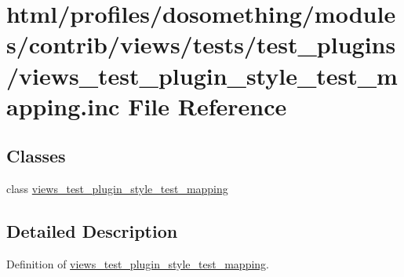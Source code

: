 \hypertarget{views__test__plugin__style__test__mapping_8inc}{
\section{html/profiles/dosomething/modules/contrib/views/tests/test\_\-plugins/views\_\-test\_\-plugin\_\-style\_\-test\_\-mapping.inc File Reference}
\label{views__test__plugin__style__test__mapping_8inc}
}
\subsection*{Classes}
\begin{DoxyCompactItemize}
\item 
class \hyperlink{classviews__test__plugin__style__test__mapping}{views\_\-test\_\-plugin\_\-style\_\-test\_\-mapping}
\end{DoxyCompactItemize}


\subsection{Detailed Description}
Definition of \hyperlink{classviews__test__plugin__style__test__mapping}{views\_\-test\_\-plugin\_\-style\_\-test\_\-mapping}. 